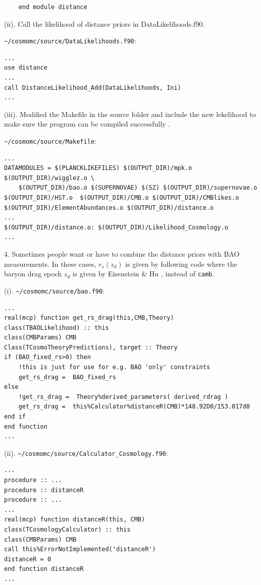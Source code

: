 \documentclass[floatfix,aps,amsmath,nofootinbib,onecolumn,10pt]{revtex4}
\begin{document}
\begin{appendix}
\begin{lstlisting}
    end module distance
\end{lstlisting}

(ii). Call the likelihood of distance priors in DataLikelihoods.f90.

\verb|~/cosmomc/source/DataLikelihoods.f90|:
\begin{lstlisting}
...
use distance
...
call DistanceLikelihood_Add(DataLikelihoods, Ini)
...
\end{lstlisting}

(iii). Modified the Makefile in the source folder and include the new lekelihood to make sure the program can be compiled successfully .

\verb|~/cosmomc/source/Makefile|:
\begin{lstlisting}
...
DATAMODULES = $(PLANCKLIKEFILES) $(OUTPUT_DIR)/mpk.o $(OUTPUT_DIR)/wigglez.o \
	$(OUTPUT_DIR)/bao.o $(SUPERNOVAE) $(SZ) $(OUTPUT_DIR)/supernovae.o $(OUTPUT_DIR)/HST.o  $(OUTPUT_DIR)/CMB.o $(OUTPUT_DIR)/CMBlikes.o $(OUTPUT_DIR)/ElementAbundances.o $(OUTPUT_DIR)/distance.o
...
$(OUTPUT_DIR)/distance.o: $(OUTPUT_DIR)/Likelihood_Cosmology.o
...
\end{lstlisting}

4. Sometimes people want or have to combine the distance priors with BAO measurements. In these cases, $r_s(z_d)$ is given by following code where the baryon drag epoch $z_d$ is given by Eisenstein \& Hu \cite{Eisenstein:1997ik}, instead of \verb|camb|. 

(i). \verb|~/cosmomc/source/bao.f90|:
\begin{lstlisting}
...
real(mcp) function get_rs_drag(this,CMB,Theory)
class(TBAOLikelihood) :: this
class(CMBParams) CMB
Class(TCosmoTheoryPredictions), target :: Theory
if (BAO_fixed_rs>0) then
    !this is just for use for e.g. BAO 'only' constraints
    get_rs_drag =  BAO_fixed_rs
else
    !get_rs_drag =  Theory%derived_parameters( derived_rdrag )
    get_rs_drag =  this%Calculator%distanceR(CMB)*148.92D0/153.017d0
end if
end function
...
\end{lstlisting}

(ii). \verb|~/cosmomc/source/Calculator_Cosmology.f90|:
\begin{lstlisting}
...
procedure :: ...
procedure :: distanceR
procedure :: ...
...
real(mcp) function distanceR(this, CMB)
class(TCosmologyCalculator) :: this
class(CMBParams) CMB
call this%ErrorNotImplemented('distanceR')
distanceR = 0
end function distanceR
...
\end{lstlisting}


\end{appendix}
\end{document}
